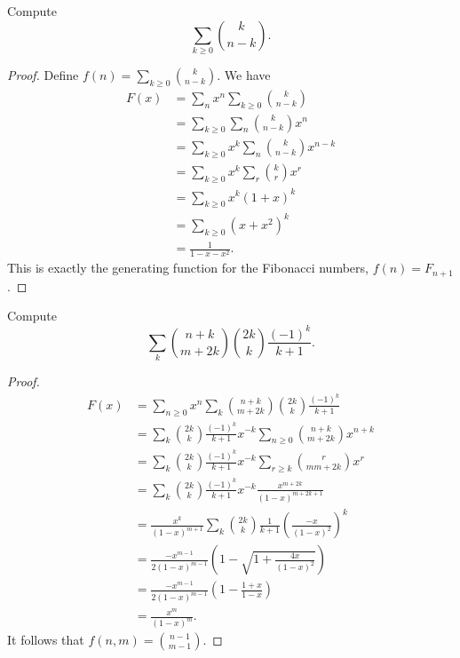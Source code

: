 \documentclass[11pt]{article}
\renewcommand{\>}{\rangle}
\newcommand{\<}{\langle}
\begin{document}
\begin{example} Compute $$\sum_{k \ge 0} \binom{k}{n-k}.$$

\end{example}
\begin{proof}
Define $f(n) = \sum_{k \ge 0} \binom{k}{n-k}$.  We have 
\begin{align*}
F(x) &= \sum_n x^n \sum_{k \ge 0} \binom{k}{n-k} \\
&= \sum_{k \ge 0} \sum_{n} \binom{k}{n-k} x^n \\
&= \sum_{k \ge 0} x^{k} \sum_{n} \binom{k}{n-k} x^{n-k} \\
&= \sum_{k \ge 0} x^k \sum_{r} \binom{k}{r} x^r \\
&= \sum_{k \ge 0} x^k (1 + x)^k \\
&= \sum_{k \ge 0} (x + x^2)^k \\
&= \frac{1}{1 - x -x^2}.
\end{align*}
This is exactly the generating function for the Fibonacci numbers, $f(n) = F_{n + 1}$.
\end{proof}
\begin{example} Compute 
$$\sum_k \binom{n + k}{m + 2k} \binom{2k}{k} \frac{(-1)^k}{k + 1}.$$
\end{example}
\begin{proof}
\begin{align*}
F(x) &= \sum_{n \ge 0} x^n \sum_{k} \binom{n + k}{m + 2k} \binom{2k}{k} \frac{(-1)^k}{k + 1} \\
&= \sum_k \binom{2k}{k} \frac{(-1)^k}{k + 1} x^{-k} \sum_{n \ge 0} \binom{n + k}{m + 2k} x^{n + k} \\
&= \sum_k \binom{2k}{k} \frac{(-1)^k}{k+1} x^{-k} \sum_{r\ge k} \binom{r}{mm + 2k} x^r \\
&= \sum_k \binom{2k}{k} \frac{(-1)^k}{k+1} x^{-k} \frac{x^{m + 2k}}{(1 - x)^{m + 2k + 1}} \\
&= \frac{x^k}{(1 - x)^{m + 1} }\sum_k \binom{2k}{k} \frac{1}{k + 1} \left(\frac{-x}{(1-x)^2} \right)^k \\
&= \frac{-x^{m-1}}{2(1-x)^{m-1}} \left (1 - \sqrt{1 + \frac{4x}{(1-x)^2}} \right) \\
&= \frac{-x^{m-1}}{2(1-x)^{m-1}} \left (1 - \frac{1+x}{1-x} \right) \\
&= \frac{x^m}{(1-x)^m}.
\end{align*}
It follows that $f(n, m) = \binom{n-1}{m-1}$.
\end{proof}
\pagebreak
\end{document}
